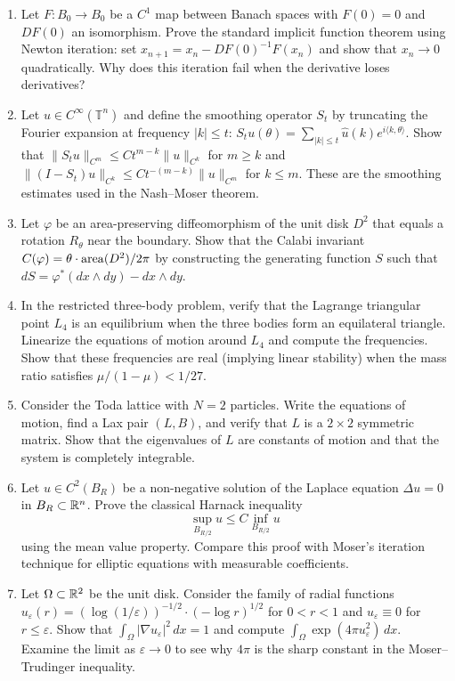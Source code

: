 \begin{enumerate}
\item [I] Let $F: B_0 \to B_0$ be a $C^1$ map between Banach spaces with $F(0) = 0$ and $DF(0)$ an isomorphism. Prove the standard implicit function theorem using Newton iteration: set $x_{n+1} = x_n - DF(0)^{-1}F(x_n)$ and show that $x_n \to 0$ quadratically. Why does this iteration fail when the derivative loses derivatives?

\item [I] Let $u \in C^\infty(\mathbb{T}^n)$ and define the smoothing operator $S_t$ by truncating the Fourier expansion at frequency $|k| \leq t$: $S_t u(\theta) = \sum_{|k| \leq t} \hat{u}(k) e^{i\langle k,\theta \rangle}$. Show that $\|S_t u\|_{C^m} \leq C t^{m - k} \|u\|_{C^k}$ for $m \geq k$ and $\|(I - S_t) u\|_{C^k} \leq C t^{-(m-k)} \|u\|_{C^m}$ for $k \leq m$. These are the smoothing estimates used in the Nash--Moser theorem.

\item [I] Let $\varphi$ be an area-preserving diffeomorphism of the unit disk $D^2$ that equals a rotation $R_\theta$ near the boundary. Show that the Calabi invariant $C(\varphi) = \theta \cdot \operatorname{area}(D^2)/2\pi$ by constructing the generating function $S$ such that $dS = \varphi^*(dx \wedge dy) - dx \wedge dy$.

\item [I] In the restricted three-body problem, verify that the Lagrange triangular point $L_4$ is an equilibrium when the three bodies form an equilateral triangle. Linearize the equations of motion around $L_4$ and compute the frequencies. Show that these frequencies are real (implying linear stability) when the mass ratio satisfies $\mu/(1-\mu) < 1/27$.

\item [I] Consider the Toda lattice with $N=2$ particles. Write the equations of motion, find a Lax pair $(L,B)$, and verify that $L$ is a $2 \times 2$ symmetric matrix. Show that the eigenvalues of $L$ are constants of motion and that the system is completely integrable.

\item [B] Let $u \in C^2(B_R)$ be a non-negative solution of the Laplace equation $\Delta u = 0$ in $B_R \subset \mathbb{R}^n$. Prove the classical Harnack inequality
\[
\sup_{B_{R/2}} u \leq C \inf_{B_{R/2}} u
\]
using the mean value property. Compare this proof with Moser's iteration technique for elliptic equations with measurable coefficients.

\item [A] Let $\Omega \subset \mathbb{R}^2$ be the unit disk. Consider the family of radial functions $u_\varepsilon(r) = (\log(1/\varepsilon))^{-1/2} \cdot (-\log r)^{1/2}$ for $0 < r < 1$ and $u_\varepsilon \equiv 0$ for $r \leq \varepsilon$. Show that $\int_\Omega |\nabla u_\varepsilon|^2 \, dx = 1$ and compute $\int_\Omega \exp(4\pi u_\varepsilon^2) \, dx$. Examine the limit as $\varepsilon \to 0$ to see why $4\pi$ is the sharp constant in the Moser--Trudinger inequality.


\end{enumerate}
